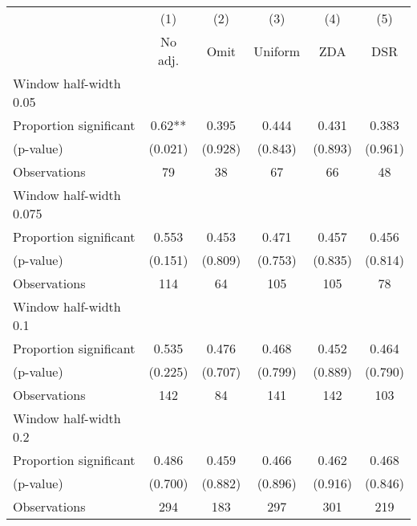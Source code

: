 
\def\sym#1{\ifmmode^{#1}\else\(^{#1}\)\fi}
\begin{tabular}{l*{5}{c}}
\hline\hline
& \multicolumn{1}{c}{(1)} &  \multicolumn{1}{c}{(2)} &  \multicolumn{1}{c}{(3)} &  \multicolumn{1}{c}{(4)} &  \multicolumn{1}{c}{(5)}\\
& \multicolumn{1}{c}{No adj.} &  \multicolumn{1}{c}{Omit} &  \multicolumn{1}{c}{Uniform} &  \multicolumn{1}{c}{ZDA} &  \multicolumn{1}{c}{DSR}\\

\hline
\hline
Window half-width 0.05\\

Proportion significant& 0.62** &  0.395 &  0.444 &  0.431 &  0.383\\

(p-value) & (0.021) &  (0.928) &  (0.843) &  (0.893) &  (0.961)\\

Observations& 79 &  38 &  67 &  66 &  48\\

\hline
Window half-width 0.075\\

Proportion significant& 0.553 &  0.453 &  0.471 &  0.457 &  0.456\\

(p-value) & (0.151) &  (0.809) &  (0.753) &  (0.835) &  (0.814)\\

Observations& 114 &  64 &  105 &  105 &  78\\

\hline
Window half-width 0.1\\

Proportion significant& 0.535 &  0.476 &  0.468 &  0.452 &  0.464\\

(p-value) & (0.225) &  (0.707) &  (0.799) &  (0.889) &  (0.790)\\

Observations& 142 &  84 &  141 &  142 &  103\\

\hline
Window half-width 0.2\\

Proportion significant& 0.486 &  0.459 &  0.466 &  0.462 &  0.468\\

(p-value) & (0.700) &  (0.882) &  (0.896) &  (0.916) &  (0.846)\\

Observations& 294 &  183 &  297 &  301 &  219\\


\end{tabular}
